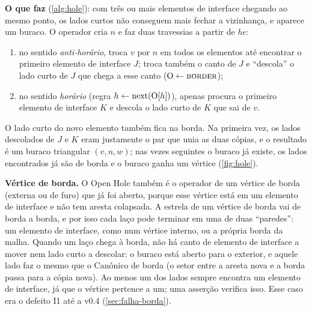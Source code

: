 \textbf{O que faz} (\cref{alg:hole}): com três ou mais elementos de interface chegando ao mesmo ponto, os lados curtos não
conseguem mais fechar a vizinhança, e aparece um buraco. O operador cria $n$ e faz duas travessias a partir de $he$:
\begin{enumerate}
\item no sentido \emph{anti-horário}, troca $v$ por $n$ em todos os elementos até encontrar o primeiro elemento de
interface $J$; troca também o canto de $J$ e ``descola'' o lado curto de $J$ que chega a esse canto ($\mathrm{O}\gets\textsc{border}$);
\item no sentido \emph{horário} (regra $h\leftarrow\mathrm{next}(\mathrm{O}[h])$), apenas procura o primeiro elemento de interface $K$ e
descola o lado curto de $K$ que sai de $v$.
\end{enumerate}
O lado curto do novo elemento também fica na borda. Na primeira vez, os lados descolados de $J$ e $K$ eram justamente o
par que unia as duas cópias, e o resultado é um buraco triangular $(v,n,w)$; nas vezes seguintes o buraco já existe, os
lados encontrados já são de borda e o buraco ganha um vértice (\cref{fig:hole}).

\textbf{Vértice de borda.} O Open Hole também é o operador de um vértice de borda (externa ou de furo) que já foi aberto,
porque esse vértice está em um elemento de interface e não tem aresta colapsada. A estrela de um vértice de borda vai de
borda a borda, e por isso cada laço pode terminar em uma de duas ``paredes'': um elemento de interface, como num vértice
interno, ou a própria borda da malha. Quando um laço chega à borda, não há canto de elemento de interface a mover nem
lado curto a descolar: o buraco está aberto para o exterior, e aquele lado faz o mesmo que o Canônico de borda (o setor
entre a aresta nova e a borda passa para a cópia nova). Ao menos um dos lados sempre encontra um elemento de interface,
já que o vértice pertence a um; uma asserção verifica isso. Esse caso era o defeito I1 até a v0.4
(\cref{sec:falha-borda}).

